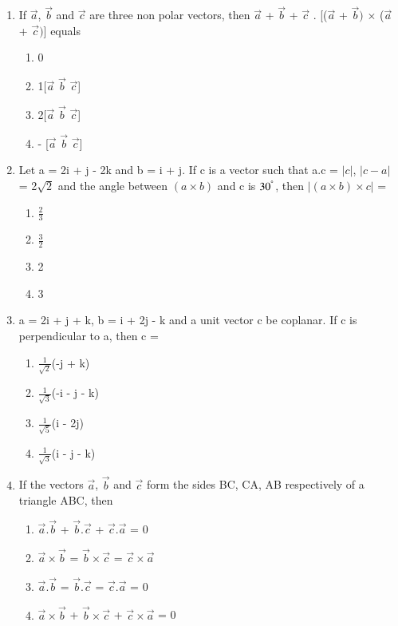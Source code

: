 \begin{enumerate}[label=\arabic*.,ref=\thesubsection.\theenumi]
\item If $\overrightarrow{a}$, $\overrightarrow{b}$ and $\overrightarrow{c}$ are three non polar vectors, then $\overrightarrow{a}$ + $\overrightarrow{b}$ + $\overrightarrow{c}$ . [($\overrightarrow{a}$ + $\overrightarrow{b})$ $\times$ ($\overrightarrow{a}$ + $\overrightarrow{c})$] equals
\begin{enumerate}
\item 0
\item 1[$\overrightarrow{a}$  $\overrightarrow{b}$  $\overrightarrow{c}$]
\item 2[$\overrightarrow{a}$  $\overrightarrow{b}$  $\overrightarrow{c}$]
\item - [$\overrightarrow{a}$  $\overrightarrow{b}$  $\overrightarrow{c}$]
\end{enumerate}

\item Let a = 2i + j - 2k and b = i + j. If c is a vector such that a.c = $|c|$, $|c - a|$ = 2$\sqrt{2}$ and the angle between $(a \times b)$ and c is $30^{\degree}$, then $| (a \times b) \times c| $ = 
\begin{enumerate}
\item $\frac{2}{3}$
\item $\frac{3}{2}$
\item 2
\item 3
\end{enumerate}

\item a = 2i + j + k, b = i + 2j - k and a unit vector c be coplanar. If c is perpendicular to a, then c = 
\begin{enumerate}
\item $\frac{1}{\sqrt{2}}$(-j + k)
\item $\frac{1}{\sqrt{3}}$(-i - j - k)
\item $\frac{1}{\sqrt{5}}$(i - 2j)
\item $\frac{1}{\sqrt{3}}$(i - j - k)
\end{enumerate}

\item If the vectors $\overrightarrow{a}$, $\overrightarrow{b}$ and $\overrightarrow{c}$ form the sides BC, CA, AB respectively of a triangle ABC, then
\begin{enumerate}
\item $\overrightarrow{a} . \overrightarrow{b}$ + $\overrightarrow{b} . \overrightarrow{c}$ + $\overrightarrow{c} . \overrightarrow{a}$ = 0
\item $\overrightarrow{a} \times \overrightarrow{b}$ = $\overrightarrow{b} \times \overrightarrow{c}$ = $\overrightarrow{c} \times \overrightarrow{a}$
\item $\overrightarrow{a} . \overrightarrow{b}$ = $\overrightarrow{b} . \overrightarrow{c}$ = $\overrightarrow{c} . \overrightarrow{a}$ = 0
\item $\overrightarrow{a} \times \overrightarrow{b}$ + $\overrightarrow{b} \times \overrightarrow{c}$ + $\overrightarrow{c} \times \overrightarrow{a}$ = 0
\end{enumerate}


\end{enumerate}
